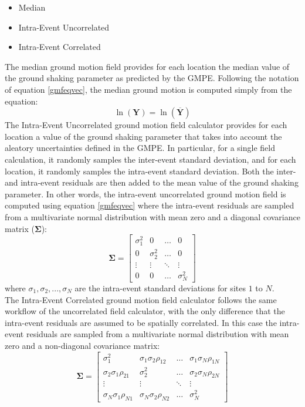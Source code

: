\begin{itemize}
\item Median
\item Intra-Event Uncorrelated
\item Intra-Event Correlated
\end{itemize}
The median ground motion field provides for each location the median value of the ground shaking parameter as predicted by the GMPE. Following the notation of equation \ref{gmfeqvec}, the median ground motion is computed simply from the equation:\\
\begin{equation}
\ln (\bm{Y}) = \ln (\overline{\bm{Y}})
\end{equation}
The Intra-Event Uncorrelated ground motion field calculator provides for each location a value of the ground shaking parameter that takes into account the aleatory uncertainties defined in the GMPE. In particular, for a single field calculation, it randomly samples the inter-event standard deviation, and for each location, it randomly samples the intra-event standard deviation. Both the inter- and intra-event residuals are then added to the mean value of the ground shaking parameter. In other words, the intra-event uncorrelated ground motion field is computed using equation \ref{gmfeqvec} where the intra-event residuals are sampled from a multivariate normal distribution with mean zero and a diagonal covariance matrix ($\bm{\Sigma}$):
\begin{equation}
\bm{\Sigma}=
\begin{bmatrix}
\sigma^{2}_{1} &  0  & \ldots & 0\\
0  &  \sigma^{2}_{2} & \ldots & 0\\
\vdots & \vdots & \ddots & \vdots\\
0  &   0       &\ldots & \sigma^{2}_{N}
\end{bmatrix}
\end{equation}
where $\sigma_{1}, \sigma_{2},...,\sigma_{N}$ are the intra-event standard deviations for sites $1$ to $N$.\\
The Intra-Event Correlated ground motion field calculator follows the same workflow of the uncorrelated field calculator, with the only difference that the intra-event residuals are assumed to be spatially correlated. In this case the intra-event residuals are sampled from a multivariate normal distribution with mean zero and a non-diagonal covariance matrix:
\begin{equation}
\bm{\Sigma}=
\begin{bmatrix}
\sigma^{2}_{1} &  \sigma_{1}\sigma_{2}\rho_{12}  & \ldots &  \sigma_{1}\sigma_{N}\rho_{1N}\\
\sigma_{2}\sigma_{1}\rho_{21}  &  \sigma^{2}_{2} & \ldots &  \sigma_{2}\sigma_{N}\rho_{2N}\\
\vdots & \vdots & \ddots & \vdots\\
\sigma_{N}\sigma_{1}\rho_{N1}  &   \sigma_{N}\sigma_{2}\rho_{N2}       &\ldots & \sigma^{2}_{N}
\end{bmatrix}
\end{equation}
